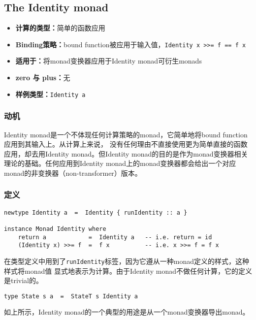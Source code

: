 \subsection{The Identity monad}
\begin{itemize}[leftmargin=*,topsep=0pt,itemsep=0pt]
\item \textbf{计算的类型：}简单的函数应用
\item \textbf{Binding策略：}bound function被应用于输入值，\texttt{Identity x >>= f == f x}
\item \textbf{适用于：}将monad变换器应用于Identity monad可衍生monads
\item \textbf{zero 与 plus：}无
\item \textbf{样例类型：}\texttt{Identity a}
\end{itemize}

\subsubsection{动机}
\indent{}Identity monad是一个不体现任何计算策略的monad，它简单地将bound function应用到其输入上。从计算上来说，
没有任何理由不直接使用更为简单直接的函数应用，却去用Identity monad。但Identity monad的目的是作为monad变换器相关
理论的基础。任何应用到Identity monad上的monad变换器都会给出一个对应monad的非变换器（non-transformer）版本。

\subsubsection{定义}
\vspace{-1em}
\begin{verbatim}
newtype Identity a  =  Identity { runIdentity :: a }

instance Monad Identity where
    return a            =  Identity a   -- i.e. return = id
    (Identity x) >>= f  =  f x          -- i.e. x >>= f = f x
\end{verbatim}
\noindent{}在类型定义中用到了\texttt{runIdentity}标签，因为它遵从一种monad定义的样式，这种样式将monad值
显式地表示为计算。由于Identity monad不做任何计算，它的定义是trivial的。
\begin{verbatim}
type State s a  =  StateT s Identity a
\end{verbatim}
如上所示，Identity monad的一个典型的用途是从一个monad变换器导出monad。
\clearpage


